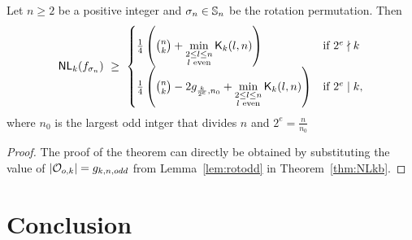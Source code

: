 \documentclass{llncs}
\begin{document}
\begin{theorem}\label{thm:NLkb_sigma}
Let $n \geq 2$ be a positive integer and $\sigma_n \in \mathbb{S}_n$ be the rotation permutation.
Then $$\mathsf{NL}_{k}(f_{\sigma_n}) ~\geq ~
\begin{cases}
\frac{1}{4}\left({n \choose k} + \min\limits_{\substack{2 \leq l \leq n \\ l \text{ even}}} \mathsf{K}_{k}(l,n)\right) & \text{if } 2^e \nmid k \\
\frac{1}{4}\left({n \choose k} - 2g_{\frac{k}{2^e},n_0} + \min\limits_{\substack{2 \leq l \leq n \\ l \text{ even}}} \mathsf{K}_{k}(l,n)\right) & \text{if } 2^e \mid k,
\end{cases}$$
where $n_0$ is the largest odd intger that divides $n$ and $2^e = \frac{n}{n_0}$
\end{theorem}
\begin{proof} The proof of the theorem can directly be obtained by substituting the value of $|\mathcal{O}_{o,k}| = g_{k,n,odd}$ from Lemma~\ref{lem:rotodd} in Theorem~\ref{thm:NLkb}.
\end{proof}

\section{Conclusion}\label{sec:con}








\ifnum{}
%


\else


\end{document}
